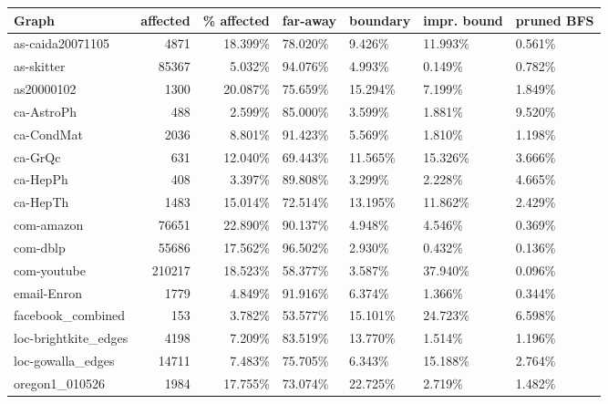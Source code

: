 \begin{table}[h!]
\begin{tabular}{lrrllll}
\toprule
 Graph                &   affected &   \% affected & far-away   & boundary   & impr. bound   & pruned BFS   \\
\midrule \midrule
 as-caida20071105     &       4871 & 18.399\% & 78.020\%    & 9.426\%     & 11.993\%       & 0.561\%   \\
 as-skitter           &      85367 & 5.032\%  & 94.076\%    & 4.993\%     & 0.149\%        & 0.782\%   \\
 as20000102           &       1300 & 20.087\% & 75.659\%    & 15.294\%    & 7.199\%        & 1.849\%   \\
 ca-AstroPh           &        488 & 2.599\%  & 85.000\%    & 3.599\%     & 1.881\%        & 9.520\%   \\
 ca-CondMat           &       2036 & 8.801\%  & 91.423\%    & 5.569\%     & 1.810\%        & 1.198\%   \\
 ca-GrQc              &        631 & 12.040\% & 69.443\%    & 11.565\%    & 15.326\%       & 3.666\%   \\
 ca-HepPh             &        408 & 3.397\%  & 89.808\%    & 3.299\%     & 2.228\%        & 4.665\%   \\
 ca-HepTh             &       1483 & 15.014\% & 72.514\%    & 13.195\%    & 11.862\%       & 2.429\%   \\
 com-amazon   &      76651 & 22.890\% & 90.137\%    & 4.948\%     & 4.546\%        & 0.369\%   \\
 com-dblp     &      55686 & 17.562\% & 96.502\%    & 2.930\%     & 0.432\%        & 0.136\%   \\
 com-youtube  &     210217 & 18.523\% & 58.377\%    & 3.587\%     & 37.940\%       & 0.096\%   \\
 email-Enron          &       1779 & 4.849\%  & 91.916\%    & 6.374\%     & 1.366\%        & 0.344\%   \\
 facebook\_combined    &        153 & 3.782\%  & 53.577\%    & 15.101\%    & 24.723\%       & 6.598\%   \\
 loc-brightkite\_edges &       4198 & 7.209\%  & 83.519\%    & 13.770\%    & 1.514\%        & 1.196\%   \\
 loc-gowalla\_edges    &      14711 & 7.483\%  & 75.705\%    & 6.343\%     & 15.188\%       & 2.764\%   \\
 oregon1\_010526       &       1984 & 17.755\% & 73.074\%    & 22.725\%    & 2.719\%        & 1.482\%   \\

\end{tabular}
\end{table}
